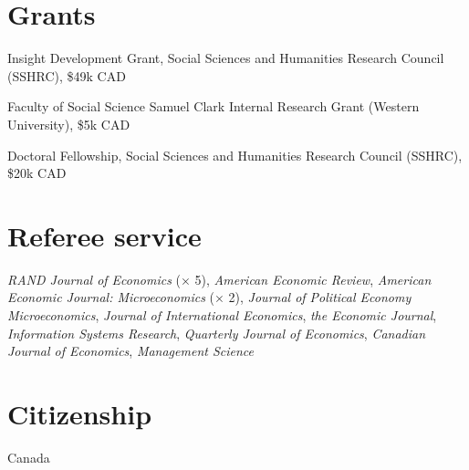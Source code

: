 \documentclass[11pt]{article} %
\begin{document}
\section*{Grants}

 Insight Development Grant, Social Sciences and Humanities Research Council (SSHRC), \$49k CAD

 Faculty of Social Science Samuel Clark Internal Research Grant (Western University), \$5k CAD

  Doctoral Fellowship, Social Sciences and Humanities Research Council (SSHRC), \$20k CAD


\section*{Referee service}

\textit{RAND Journal of Economics} ($\times$ 5), \textit{American Economic Review},
\textit{American Economic Journal: Microeconomics} ($\times$ 2),
 \textit{Journal of Political Economy Microeconomics},
\textit{Journal of International Economics}, \textit{the Economic Journal},
\textit{Information Systems Research}, \textit{Quarterly Journal of Economics},
\textit{Canadian Journal of Economics},
\textit{Management Science}


%
%
%


\section*{Citizenship}

Canada

%
%



\vfill %
\end{document}
